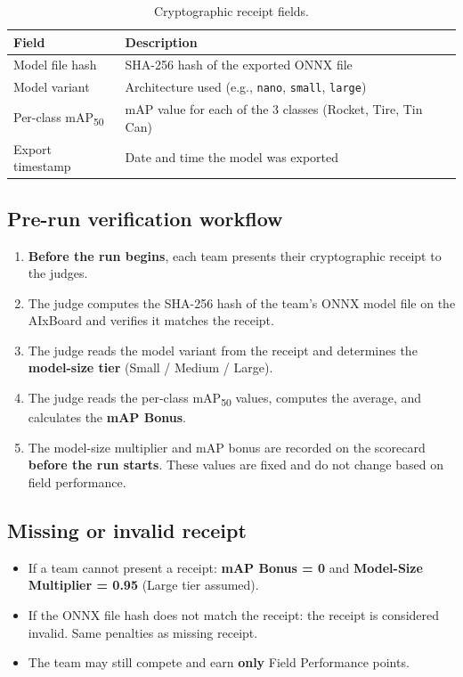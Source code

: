 \documentclass[a4]{article}
\begin{document}
\begin{table}[H]
\centering
\begin{tabular}{ll}
\toprule
\textbf{Field} & \textbf{Description} \\
\midrule
Model file hash & SHA-256 hash of the exported ONNX file \\
Model variant & Architecture used (e.g., \texttt{nano}, \texttt{small}, \texttt{large}) \\
Per-class mAP\textsubscript{50} & mAP value for each of the 3 classes (Rocket, Tire, Tin Can) \\
Export timestamp & Date and time the model was exported \\
\bottomrule
\end{tabular}
\caption{Cryptographic receipt fields.}
\end{table}

\subsection*{Pre-run verification workflow}

\begin{enumerate}
    \item \textbf{Before the run begins}, each team presents their cryptographic receipt to the judges.
    \item The judge computes the SHA-256 hash of the team's ONNX model file on the AIxBoard and verifies it matches the receipt.
    \item The judge reads the model variant from the receipt and determines the \textbf{model-size tier} (Small / Medium / Large).
    \item The judge reads the per-class mAP\textsubscript{50} values, computes the average, and calculates the \textbf{mAP Bonus}.
    \item The model-size multiplier and mAP bonus are recorded on the scorecard \textbf{before the run starts}. These values are fixed and do not change based on field performance.
\end{enumerate}

\subsection*{Missing or invalid receipt}

\begin{itemize}
    \item If a team cannot present a receipt: \textbf{mAP Bonus = 0} and \textbf{Model-Size Multiplier = 0.95} (Large tier assumed).
    \item If the ONNX file hash does not match the receipt: the receipt is considered invalid. Same penalties as missing receipt.
    \item The team may still compete and earn \textbf{only} Field Performance points.
\end{itemize}
\end{document}
